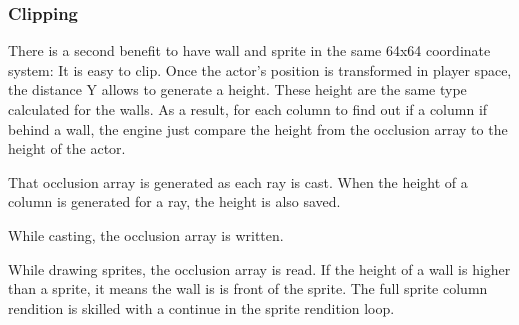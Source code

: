 \subsubsection{Clipping}
There is a second benefit to have wall and sprite in the same 64x64 coordinate system: It is easy to clip. Once the actor's position is transformed in player space, the distance Y allows to generate a height. These height are the same type calculated for the walls. As a result, for each column to find out if a column if behind a wall, the engine just compare the height from the occlusion array to the height of the actor.\\
\par
That occlusion array is generated as each ray is cast. When the height of a column is generated for a ray, the height is also saved.\\
\par
\begin{minipage}{\textwidth}

\end{minipage}
\par
While casting, the occlusion array is written.\\
\begin{minipage}{\textwidth}

\end{minipage}
While drawing sprites, the occlusion array is read. If the height of a wall is higher than a sprite, it means the wall is is front of the sprite. The full sprite column rendition is skilled with a continue in the sprite rendition loop.\\
\begin{minipage}{\textwidth}

\end{minipage}
\par






